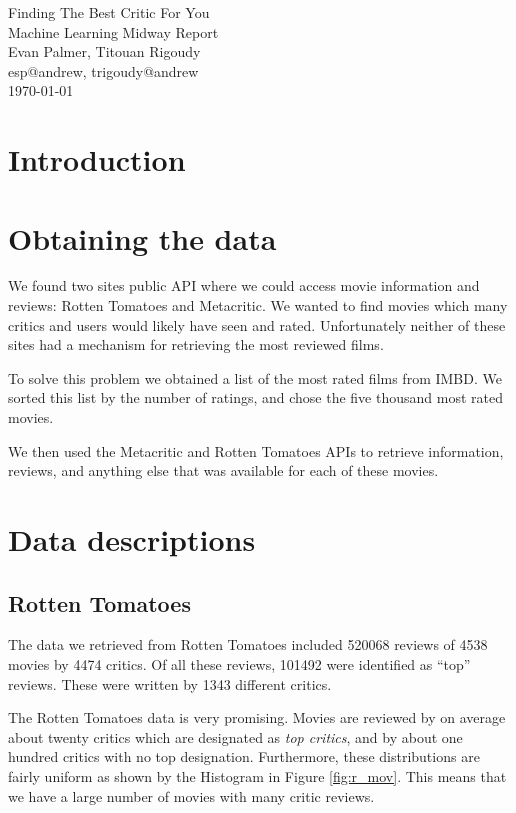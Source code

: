 \documentclass[12pt]{article}
\makeatletter
\newcommand{\myname}{Evan Palmer, Titouan Rigoudy}
\newcommand{\myandrew}{esp@andrew, trigoudy@andrew}
\newcommand{\thedate}{\today}
\makeatother
\begin{document}
	\medskip    
	\thispagestyle{plain}
	\begin{center}                 
	{\LARGE Finding The Best Critic For You} \\
	\medskip
	Machine Learning Midway Report \\
	\smallskip
	\myname \\
	\myandrew \\
	\thedate \\
	\end{center}
	\vspace{0.5cm}

\section{Introduction}

\section{Obtaining the data}

	We found two sites public API where we could access movie information and reviews: Rotten Tomatoes and Metacritic. We wanted to find movies which many critics and users would likely have seen and rated. Unfortunately neither of these sites had a mechanism for retrieving the most reviewed films. 

	To solve this problem we obtained a list of the most rated films from IMBD. We sorted this list by the number of ratings, and chose the five thousand most rated movies. 

	We then used the Metacritic and Rotten Tomatoes APIs to retrieve information, reviews, and anything else that was available for each of these movies.

\section{Data descriptions}

\subsection{Rotten Tomatoes}

	The data we retrieved from Rotten Tomatoes included 520068 reviews of 4538 movies by 4474 critics. Of all these reviews, 101492 were identified as ``top'' reviews. These were written by 1343 different critics.

	The Rotten Tomatoes data is very promising. Movies are reviewed by on average about twenty critics which are designated as \textit{top critics}, and by about one hundred critics with no top designation. Furthermore, these distributions are fairly uniform as shown by the Histogram in Figure \ref{fig:r_mov}. This means that we have a large number of movies with many critic reviews.
\end{document}
